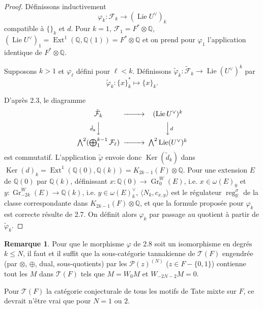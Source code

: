 \documentclass[12pt,a4paper]{article}
\theoremstyle{plain}
\theoremstyle{definition}
\newtheorem{remark}{Remarque}[section]
\theoremstyle{remark}
\DeclareMathOperator{\Ext}{Ext}
\DeclareMathOperator*{\Ker}{Ker}
\DeclareMathOperator{\reg}{reg}
\DeclareMathOperator{\Lie}{Lie}
\newcommand{\Q}{\mathbb{Q}}
\newcommand{\R}{\mathbb{R}}
\newcommand{\F}{\mathcal{F}}
\begin{document}
\begin{proof}
D\'efinissons inductivement
\begin{equation*}
\varphi_k : \F_k \longrightarrow (\Lie U^\vee)_k
\end{equation*}
compatible {\`a} $\{\}_k$ et $d$. Pour $k=1$, $\F_1=F^*\otimes\Q$, $(\Lie U^\vee)_1=\Ext^1(\Q,\Q(1))=F^*\otimes\Q$ et on prend pour $\varphi_1$ l'application identique de $F^*\otimes\Q$.

Supposons $k>1$ et $\varphi_\ell$ d\'efini pour $\ell<k$. D\'efinissons $\tilde{\varphi}_k:\tilde{\F}_k\to\Lie(U^\vee)^k$ par
\begin{equation*}
\tilde{\varphi}_k : \{x\}_k^* \longmapsto \{x\}_k.
\end{equation*}

D'apr\`es 2.3, le diagramme
\begin{equation*}
\begin{CD}
\tilde{\F}_k @>>> (\Lie U^\vee)^k \\
@V{\tilde{d}_k}VV @VV{d}V \\
\bigwedge^2(\bigoplus_1^{k-1}\F_\ell) @>>> \bigwedge^2\Lie(U^\vee)^k
\end{CD}
\end{equation*}
est commutatif. L'application $\tilde{\varphi}$ envoie donc $\Ker(\tilde{d}_k)$ dans $\Ker(d)_k=\Ext^1(\Q(0),\Q(k))=K_{2k-1}(F)\otimes\Q$. Pour une extension $E$ de $\Q(0)$ par $\Q(k)$, d\'efinissant $x:\Q(0)\to\operatorname{Gr}^W_0(E)$, i.e. $x\in\omega(E)_0$ et $y:\operatorname{Gr}^W_{-2k}(E)\to\Q(k)$, i.e. $y\in\omega(E)_k^\vee$, $\langle N_k,c_{x,y}\rangle$ est le r\'egulateur $\reg_\R^\sigma$ de la classe correspondante dans $K_{2k-1}(F)\otimes\Q$, et que la formule propos\'ee pour $\varphi_k$ est correcte r\'esulte de 2.7. On d\'efinit alors $\varphi_k$ par passage au quotient {\`a} partir de $\tilde{\varphi}_k$.
\end{proof}

\begin{remark}
Pour que le morphisme $\varphi$ de 2.8 soit un isomorphisme en degr\'es $k\leq N$, il faut et il suffit que la sous-cat\'egorie tannakienne de $\mathcal{T}(F)$ engendr\'ee (par $\otimes$, $\oplus$, dual, sous-quotients) par les $\mathcal{P}(z)^{(N)}$ ($z\in F-\{0,1\}$) contienne tout les $M$ dans $\mathcal{T}(F)$ tels que $M=W_0 M$ et $W_{-2N-2}M=0$.

Pour $\mathcal{T}(F)$ la cat\'egorie conjecturale de tous les motifs de Tate mixte sur $F$, ce devrait n'\^etre vrai que pour $N=1$ ou $2$.
\end{remark}
\end{document}
